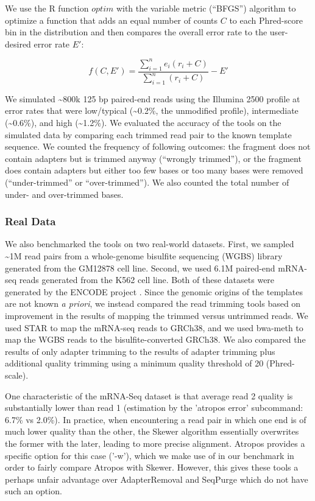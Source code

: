 \documentclass[fleqn,10pt,lineno]{wlpeerj} %
\begin{document}
We use the R function $optim$ with the variable metric (``BFGS'') algorithm to optimize a function that adds an equal number of counts $C$ to each Phred-score bin in the distribution and then compares the overall error rate to the user-desired error rate $E'$:

\begin{equation}
f(C,E') = \frac{\sum_{i=1}^{n} e_{i} (r_{i} + C)}{\sum_{i=1}^{n} (r_{i} + C)} - E'
\label{eq:optim}
\end{equation}

We simulated \textasciitilde{}800k 125 bp paired-end reads using the Illumina 2500 profile at error rates that were low/typical (\textasciitilde{}0.2\%, the unmodified profile), intermediate (\textasciitilde{}0.6\%), and high (\textasciitilde{}1.2\%). We evaluated the accuracy of the tools on the simulated data by comparing each trimmed read pair to the known template sequence. We counted the frequency of following outcomes: the fragment does not contain adapters but is trimmed anyway (``wrongly trimmed''), or the fragment does contain adapters but either too few bases or too many bases were removed (``under-trimmed'' or ``over-trimmed''). We also counted the total number of under- and over-trimmed bases.

\subsubsection{Real Data}

We also benchmarked the tools on two real-world datasets. First, we sampled \textasciitilde{}1M read pairs from a whole-genome bisulfite sequencing (WGBS) library generated from the GM12878 cell line. Second, we used 6.1M paired-end mRNA-seq reads generated from the K562 cell line. Both of these datasets were generated by the ENCODE project \citep{encode_project_consortium_integrated_2012}. Since the genomic origins of the templates are not known \textit{a priori}, we instead compared the read trimming tools based on improvement in the results of mapping the trimmed versus untrimmed reads. We used STAR \citep{dobin_star:_2013} to map the mRNA-seq reads to GRCh38, and we used bwa-meth \citep{pedersen_fast_2014} to map the WGBS reads to the bisulfite-converted GRCh38. We also compared the results of only adapter trimming to the results of adapter trimming plus additional quality trimming using a minimum quality threshold of 20 (Phred-scale).

One characteristic of the mRNA-Seq dataset is that average read 2 quality is substantially lower than read 1 (estimation by the 'atropos error' subcommand: 6.7\% vs 2.0\%). In practice, when encountering a read pair in which one end is of much lower quality than the other, the Skewer algorithm essentially overwrites the former with the later, leading to more precise alignment. Atropos provides a specific option for this case ('-w'), which we make use of in our benchmark in order to fairly compare Atropos with Skewer. However, this gives these tools a perhaps unfair advantage over AdapterRemoval and SeqPurge which do not have such an option.
\end{document}
